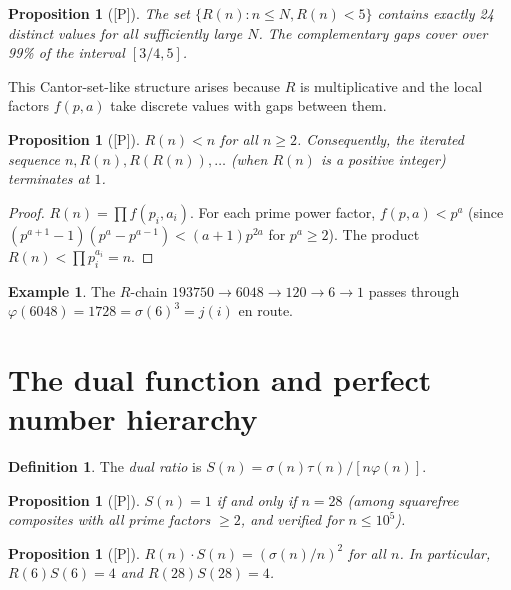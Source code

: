 \documentclass[11pt,letterpaper]{article}
\newtheorem{proposition}[theorem]{Proposition}
\theoremstyle{definition}
\newtheorem{definition}[theorem]{Definition}
\newtheorem{example}[theorem]{Example}
\theoremstyle{remark}
\newcommand{\proven}{\textsf{[P]}}
\begin{document}
\begin{proposition}[\proven]\label{prop:cantor}
The set $\{R(n) : n \leq N, R(n) < 5\}$ contains exactly 24 distinct values 
for all sufficiently large $N$. 
The complementary gaps cover over 99\% of the interval $[3/4, 5]$.
\end{proposition}

This Cantor-set-like structure arises because $R$ is multiplicative and 
the local factors $f(p,a)$ take discrete values with gaps between them.

\begin{proposition}[\proven]\label{prop:R-chain}
$R(n) < n$ for all $n \geq 2$. 
Consequently, the iterated sequence $n, R(n), R(R(n)), \ldots$ 
(when $R(n)$ is a positive integer) terminates at $1$.
\end{proposition}

\begin{proof}
$R(n) = \prod f(p_i,a_i)$. For each prime power factor, 
$f(p,a) < p^a$ (since $(p^{a+1}-1)(p^a-p^{a-1}) < (a+1)p^{2a}$ 
for $p^a \geq 2$). The product $R(n) < \prod p_i^{a_i} = n$.
\end{proof}

\begin{example}
The $R$-chain $193750 \to 6048 \to 120 \to 6 \to 1$ passes through 
$\varphi(6048) = 1728 = \sigma(6)^3 = j(i)$ en route.
\end{example}

\section{The dual function and perfect number hierarchy}
\label{sec:dual}

\begin{definition}
The \emph{dual ratio} is $S(n) = \sigma(n)\tau(n)/[n\varphi(n)]$.
\end{definition}

\begin{proposition}[\proven]\label{prop:dual-28}
$S(n) = 1$ if and only if $n = 28$ (among squarefree composites with 
all prime factors $\geq 2$, and verified for $n \leq 10^5$).
\end{proposition}

\begin{proposition}[\proven]\label{prop:RS-product}
$R(n) \cdot S(n) = (\sigma(n)/n)^2$ for all $n$.
In particular, $R(6)S(6) = 4$ and $R(28)S(28) = 4$.
\end{proposition}
\end{document}

